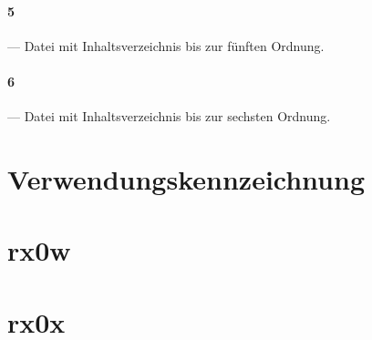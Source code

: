 \paragraph{5} --- Datei mit Inhaltsverzeichnis bis zur fünften Ordnung.

\paragraph{6} --- Datei mit Inhaltsverzeichnis bis zur sechsten Ordnung.





\label{sec:verwendungs-kennzeichnung}
\section{Verwendungskennzeichnung}





\section{rx0w}

\section{rx0x}

